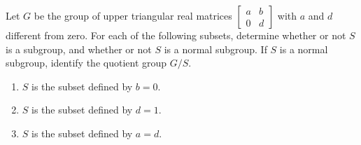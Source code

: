 \documentclass[
]{book}
\providecommand{\tightlist}{%
  \setlength{\itemsep}{0pt}\setlength{\parskip}{0pt}}
\begin{document}
\leavevmode{}%
Let \(G\) be the group of upper triangular real matrices
\(\begin{bmatrix} a & b \\ 0 & d \end{bmatrix}\) with \(a\) and \(d\)
different from zero. For each of the following subsets, determine
whether or not \(S\) is a subgroup, and whether or not \(S\) is a normal
subgroup. If \(S\) is a normal subgroup, identify the quotient group
\(G /S\).

\begin{enumerate}
\def\labelenumi{\arabic{enumi}.}
\tightlist
\item
  \(S\) is the subset defined by \(b = 0\).
\item
  \(S\) is the subset defined by \(d = 1\).
\item
  \(S\) is the subset defined by \(a = d\).
\end{enumerate}
\end{document}
